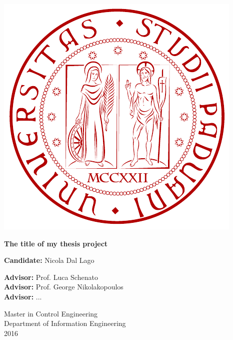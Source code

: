 \documentclass[11pt, a4paper, onecolumn, fleqn, twoside, titlepage, openright]{book}
\begin{document}
	\thispagestyle{empty}

	\begin{center}
	    \begin{minipage}{0.75\linewidth}
	        \centering
	        \includegraphics[width=0.5\linewidth]{images/logo_unipd.pdf}
	        \vspace{3cm}
	    
	        {\Large \textbf{The title of my thesis project} \par}
	        \vspace{3cm}
	    
	        \hspace{5cm}
	        \textbf{Candidate:} Nicola Dal Lago
	        \vspace{3cm}

	        \hspace{-8.7cm}\textbf{Advisor:} Prof. Luca Schenato \\
	        \hspace{-7.1cm}\textbf{Advisor:} Prof. George Nikolakopoulos \\
	        \hspace{-11.8cm}\textbf{Advisor:} ...
	        \vspace{3cm}

	        Master in Control Engineering \\
	        Department of Information Engineering \\ 
	        2016
	        
	    \end{minipage}
	\end{center}

	\clearpage
\end{document}
